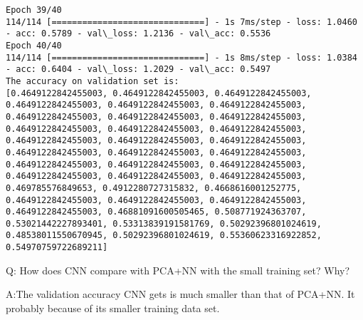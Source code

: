 \documentclass[11pt]{article}
\begin{document}
\begin{Verbatim}[commandchars=\\\{\}]
Epoch 39/40
114/114 [==============================] - 1s 7ms/step - loss: 1.0460 - acc: 0.5789 - val\_loss: 1.2136 - val\_acc: 0.5536
Epoch 40/40
114/114 [==============================] - 1s 8ms/step - loss: 1.0384 - acc: 0.6404 - val\_loss: 1.2029 - val\_acc: 0.5497
The accuracy on validation set is:
[0.4649122842455003, 0.4649122842455003, 0.4649122842455003, 0.4649122842455003, 0.4649122842455003, 0.4649122842455003, 0.4649122842455003, 0.4649122842455003, 0.4649122842455003, 0.4649122842455003, 0.4649122842455003, 0.4649122842455003, 0.4649122842455003, 0.4649122842455003, 0.4649122842455003, 0.4649122842455003, 0.4649122842455003, 0.4649122842455003, 0.4649122842455003, 0.4649122842455003, 0.4649122842455003, 0.4649122842455003, 0.4649122842455003, 0.4649122842455003, 0.469785576849653, 0.4912280727315832, 0.4668616001252775, 0.4649122842455003, 0.4649122842455003, 0.4649122842455003, 0.4649122842455003, 0.46881091600505465, 0.508771924363707, 0.53021442227893401, 0.53313839191581769, 0.50292396801024619, 0.48538011550670945, 0.50292396801024619, 0.55360623316922852, 0.54970759722689211]

    \end{Verbatim}

    Q: How does CNN compare with PCA+NN with the small training set? Why?

    A:The validation accuracy CNN gets is much smaller than that of PCA+NN.
It probably because of its smaller training data set.


    
    
    
    
\end{document}
